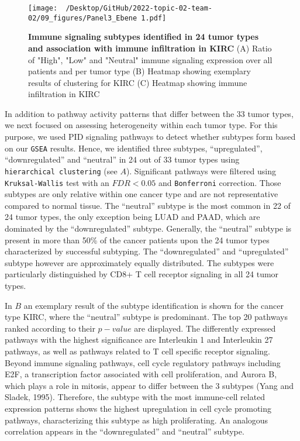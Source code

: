 \documentclass[
  parskip,
  oneside]{scrreprt}
\begin{document}
\begin{figure}[h]
  \texttt{[image: ~/Desktop/GitHub/2022-topic-02-team-02/09\_figures/Panel3\_Ebene 1.pdf]}
  \caption{\textbf{Immune signaling subtypes identified in 24 tumor types and association with immune infiltration in KIRC} (A) Ratio of "High", "Low" and "Neutral" immune signaling expression over all patients and per tumor type (B) Heatmap showing exemplary results of clustering for KIRC (C) Heatmap showing immune infiltration in KIRC}
  \label{pengplot}
\end{figure}

In addition to pathway activity patterns that differ between the 33
tumor types, we next focused on assessing heterogeneity within each
tumor type. For this purpose, we used PID signaling pathways to detect
whether subtypes form based on our \texttt{GSEA} results. Hence, we
identified three subtypes, ``upregulated'', ``downregulated'' and
``neutral'' in 24 out of 33 tumor types using
\texttt{hierarchical\ clustering} (see  \(A\)).
Significant pathways were filtered using \texttt{Kruksal-Wallis} test
with an \(FDR < 0.05\) and \texttt{Bonferroni} correction. Those
subtypes are only relative within one cancer type and are not
representative compared to normal tissue. The ``neutral'' subtype is the
most common in 22 of 24 tumor types, the only exception being LUAD and
PAAD, which are dominated by the ``downregulated'' subtype. Generally,
the ``neutral'' subtype is present in more than 50\% of the cancer
patients upon the 24 tumor types characterized by successful subtyping.
The ``downregulated'' and ``upregulated'' subtype however are
approximately equally distributed. The subtypes were particularly
distinguished by CD8+ T cell receptor signaling in all 24 tumor types.

In  \(B\) an exemplary result of the subtype
identification is shown for the cancer type KIRC, where the ``neutral''
subtype is predominant. The top 20 pathways ranked according to their
\(p-value\) are displayed. The differently expressed pathways with the
highest significance are Interleukin 1 and Interleukin 27 pathways, as
well as pathways related to T cell specific receptor signaling. Beyond
immune signaling pathways, cell cycle regulatory pathways including E2F,
a transcription factor associated with cell proliferation, and Aurora B,
which plays a role in mitosis, appear to differ between the 3 subtypes
(Yang and Sladek, 1995). Therefore, the subtype with the most
immune-cell related expression patterns shows the highest upregulation
in cell cycle promoting pathways, characterizing this subtype as high
proliferating. An analogous correlation appears in the ``downregulated''
and ``neutral'' subtype.
\end{document}
